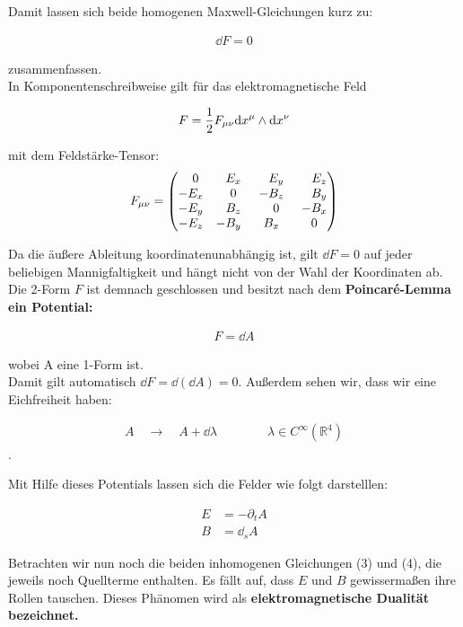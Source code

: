 Damit lassen sich beide homogenen Maxwell-Gleichungen kurz zu: 

\begin{align}
\dd F = 0
\end{align}

zusammenfassen. \\
In Komponentenschreibweise gilt für das elektromagnetische Feld

\begin{align}
F = \frac{1}{2} F_{\mu \nu} \dd x^{\mu} \wedge \dd x^{\nu}
\end{align}

mit dem Feldstärke-Tensor:
\begin{align}
F_{\mu \nu} =
\begin{pmatrix}
\phantom{-}0 & \phantom{-}E_x & \phantom{-}E_y & \phantom{-}E_z \\
-E_x & \phantom{-}0 & -B_z & \phantom{-}B_y \\
-E_y & \phantom{-}B_z & \phantom{-}0 & -B_x \\
-E_z & -B_y & \phantom{-}B_x \phantom{-}& 0
\end{pmatrix}
\end{align}

Da die äußere Ableitung koordinatenunabhängig ist, gilt $\dd F = 0$ auf jeder beliebigen Mannigfaltigkeit und hängt nicht von der Wahl der Koordinaten ab. \\
Die 2-Form $F$ ist demnach geschlossen und besitzt nach dem \bfseries Poincaré-Lemma \normalfont ein Potential:

\begin{align}
F = \dd A 
\end{align}

wobei A eine 1-Form ist. \\
Damit gilt automatisch $ \dd F = \dd (\dd A) = 0$. Außerdem sehen wir, dass wir eine Eichfreiheit haben:

\begin{align}
A \quad \rightarrow \quad A + \dd \lambda \qquad\qquad \lambda \in C^{\infty}(\mathbb{R}^4)
\end{align}.

Mit Hilfe dieses Potentials lassen sich die Felder wie folgt darstelllen:

\begin{align}
E &= -\partial_t A \\
B &= \dd_s A
\end{align}

Betrachten wir nun noch die beiden inhomogenen Gleichungen (3) und (4), die jeweils noch Quellterme enthalten. Es fällt auf, dass $E$ und $B$ gewissermaßen ihre Rollen tauschen. Dieses Phänomen wird als \bfseries elektromagnetische Dualität \normalfont bezeichnet.

